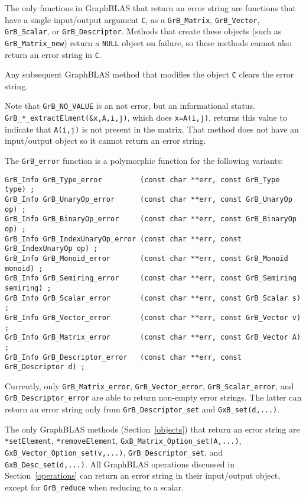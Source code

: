 \documentclass[12pt]{article}
\begin{document}
The only functions in GraphBLAS that return an error string are functions that
have a single input/output argument \verb'C', as a \verb'GrB_Matrix',
\verb'GrB_Vector', \verb'GrB_Scalar', or \verb'GrB_Descriptor'. Methods that
create these objects (such as \verb'GrB_Matrix_new') return a \verb'NULL'
object on failure, so these methods cannot also return an error string in
\verb'C'.

Any subsequent GraphBLAS method that modifies the object \verb'C' clears the
error string.

Note that \verb'GrB_NO_VALUE' is an not error, but an informational status.
\verb'GrB_*_extractElment(&x,A,i,j)', which does \verb'x=A(i,j)', returns this
value to indicate that \verb'A(i,j)' is not present in the matrix.  That
method does not have an input/output object so it cannot return an error
string.

The \verb'GrB_error' function is a polymorphic function for the
following variants:

\begin{mdframed}[userdefinedwidth=6in]
{\footnotesize
\begin{verbatim}
GrB_Info GrB_Type_error         (const char **err, const GrB_Type type) ;
GrB_Info GrB_UnaryOp_error      (const char **err, const GrB_UnaryOp op) ;
GrB_Info GrB_BinaryOp_error     (const char **err, const GrB_BinaryOp op) ;
GrB_Info GrB_IndexUnaryOp_error (const char **err, const GrB_IndexUnaryOp op) ;
GrB_Info GrB_Monoid_error       (const char **err, const GrB_Monoid monoid) ;
GrB_Info GrB_Semiring_error     (const char **err, const GrB_Semiring semiring) ;
GrB_Info GrB_Scalar_error       (const char **err, const GrB_Scalar s) ;
GrB_Info GrB_Vector_error       (const char **err, const GrB_Vector v) ;
GrB_Info GrB_Matrix_error       (const char **err, const GrB_Vector A) ;
GrB_Info GrB_Descriptor_error   (const char **err, const GrB_Descriptor d) ;
\end{verbatim}
}\end{mdframed}

Currently, only \verb'GrB_Matrix_error', \verb'GrB_Vector_error',
\verb'GrB_Scalar_error', and \verb'GrB_Descriptor_error' are able to return
non-empty error strings.  The latter can return an error string only from
\verb'GrB_Descriptor_set' and \verb'GxB_set(d,...)'.

The only GraphBLAS methods (Section~\ref{objects}) that return an error string
are \verb'*setElement', \verb'*removeElement',
\verb'GxB_Matrix_Option_set(A,...)', \newline
\verb'GxB_Vector_Option_set(v,...)', \verb'GrB_Descriptor_set', and
\verb'GxB_Desc_set(d,...)'.  All GraphBLAS operations discussed in
Section~\ref{operations} can return an error string in their input/output
object, except for \verb'GrB_reduce' when reducing to a scalar.
\end{document}
